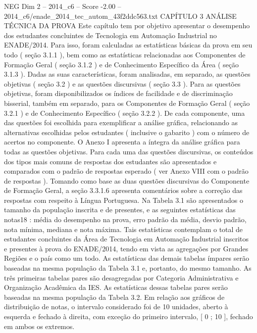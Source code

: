 \begin{textsample}{NEG Dim 2 – 2014\_c6 – Score -2.00 – 2014\_c6/enade\_2014\_tec\_autom\_43f2ddc563.txt}  \label{ex:f2_neg_205}
CAPÍTULO 3 ANÁLISE TÉCNICA DA PROVA Este capítulo tem por objetivo apresentar o desempenho dos estudantes concluintes de Tecnologia em Automação Industrial no ENADE/2014.
Para isso, foram calculadas as estatísticas básicas da prova em seu todo ( seção 3.1.1 ), bem como as estatísticas relacionadas aos Componentes de Formação Geral ( seção 3.1.2 ) e de Conhecimento Específico da Área ( seção 3.1.3 ).
Dadas as suas características, foram analisadas, em separado, as questões objetivas ( seção 3.2 ) e as questões discursivas ( seção 3.3 ).
Para as questões objetivas, foram disponibilizados os índices de facilidade e de discriminação bisserial, também em separado, para os Componentes de Formação Geral ( seção 3.2.1 ) e de Conhecimento Específico ( seção 3.2.2 ).
De cada componente, uma das questões foi escolhida para exemplificar a análise gráfica, relacionando as alternativas escolhidas pelos estudantes ( inclusive o gabarito ) com o número de acertos no componente.
O Anexo I apresenta a íntegra da análise gráfica para todas as questões objetivas.
Para cada uma das questões discursivas, os conteúdos dos tipos mais comuns de respostas dos estudantes são apresentados e comparados com o padrão de respostas esperado ( ver Anexo VIII com o padrão de respostas ).
Tomando como base as duas questões discursivas do Componente de Formação Geral, a seção 3.3.1.6 apresenta comentários sobre a correção das respostas com respeito à Língua Portuguesa.
Na Tabela 3.1 são apresentados o tamanho da população inscrita e de presentes, e as seguintes estatísticas das notas18 : média do desempenho na prova, erro padrão da média, desvio padrão, nota mínima, mediana e nota máxima.
Tais estatísticas contemplam o total de estudantes concluintes da Área de Tecnologia em Automação Industrial inscritos e presentes à prova do ENADE/2014, tendo em vista as agregações por Grandes Regiões e o país como um todo.
As estatísticas das demais tabelas ímpares serão baseadas na mesma população da Tabela 3.1 e, portanto, do mesmo tamanho.
As três primeiras tabelas pares são desagregadas por Categoria Administrativa e Organização Acadêmica da IES.
As estatísticas dessas tabelas pares serão baseadas na mesma população da Tabela 3.2.
Em relação aos gráficos de distribuição de notas, o intervalo considerado foi de 10 unidades, aberto à esquerda e fechado à direita, com exceção do primeiro intervalo, [ 0 ; 10 ], fechado em ambos os extremos.

\end{textsample}
